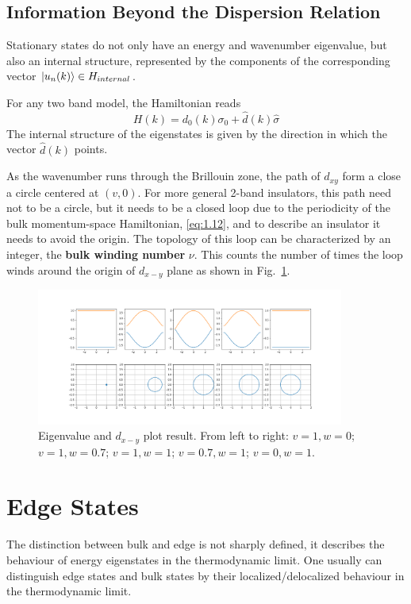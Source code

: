 \subsection{Information Beyond the Dispersion Relation}\label{sec:1.2.4}
Stationary states do not only have an energy and wavenumber eigenvalue, but also an internal structure, represented by the components of the corresponding vector $\ket{u_n(k)} \in H_{internal}$.

For any two band model, the Hamiltonian reads
\begin{equation}
    H(k) = d_0(k) \sigma_0 + \hat{d}(k) \hat{\sigma}
    \label{eq:1.17}
\end{equation}
The internal structure of the eigenstates is given by the direction in which the vector $\hat{d}(k)$ points.

As the wavenumber runs through the Brillouin zone, the path of $d_{xy}$ form a close a circle centered at $(v,0)$.
For more general 2-band insulators, this path need not to be a circle, but it needs to be a closed loop due to the periodicity of the bulk momentum-space Hamiltonian, \eqref{eq:1.12}, and to describe an insulator it needs to avoid the origin.
The topology of this loop can be characterized by an integer, the \textbf{bulk winding number} $\nu$.
This counts the number of times the loop winds around the origin of $d_{x-y}$ plane as shown in Fig.~\ref{fig:1.2}.

\begin{figure}
    \center
    \includegraphics[width=0.9\textwidth]{./fig/fig1-2.png}
    \caption{Eigenvalue and $d_{x-y}$ plot result. From left to right: $v=1,w=0$; $v=1,w=0.7$; $v=1,w=1$; $v=0.7,w=1$; $v=0,w=1$.}
    \label{fig:1.2}
\end{figure}

\section{Edge States} \label{sec:1.3}
The distinction between bulk and edge is not sharply defined, it describes the behaviour of energy eigenstates in the thermodynamic limit.
One usually can distinguish edge states and bulk states by their localized/delocalized behaviour in the thermodynamic limit.

